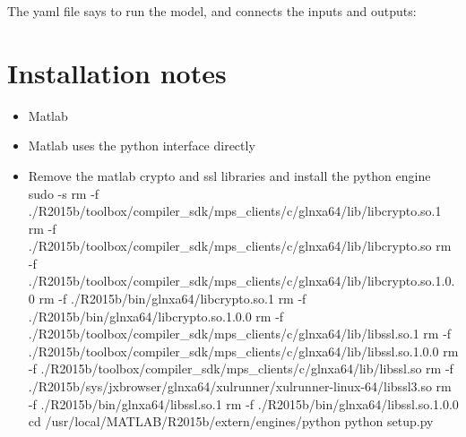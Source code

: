 \documentclass[letterpaper,10pt,english]{sphinxmanual}
\begin{document}
The yaml file says to run the model, and connects the inputs and
outputs:

\begin{sphinxVerbatim}[commandchars=\\\{\}]
   
   
   \PYG{p}{[}   \PYG{p}{]}

      
       
       
      
       

      
       
      
       
       
\end{sphinxVerbatim}


\section{Installation notes}
\label{\detokenize{includeme:installation-notes}}\begin{itemize}
\item {} 
Matlab

\item {} 
Matlab uses the python interface directly

\item {} 
Remove the matlab crypto and ssl libraries and install the python
engine sudo -s rm -f
./R2015b/toolbox/compiler\_sdk/mps\_clients/c/glnxa64/lib/libcrypto.so.1
rm -f
./R2015b/toolbox/compiler\_sdk/mps\_clients/c/glnxa64/lib/libcrypto.so
rm -f
./R2015b/toolbox/compiler\_sdk/mps\_clients/c/glnxa64/lib/libcrypto.so.1.0.0
rm -f ./R2015b/bin/glnxa64/libcrypto.so.1 rm -f
./R2015b/bin/glnxa64/libcrypto.so.1.0.0 rm -f
./R2015b/toolbox/compiler\_sdk/mps\_clients/c/glnxa64/lib/libssl.so.1
rm -f
./R2015b/toolbox/compiler\_sdk/mps\_clients/c/glnxa64/lib/libssl.so.1.0.0
rm -f
./R2015b/toolbox/compiler\_sdk/mps\_clients/c/glnxa64/lib/libssl.so
rm -f
./R2015b/sys/jxbrowser/glnxa64/xulrunner/xulrunner-linux-64/libssl3.so
rm -f ./R2015b/bin/glnxa64/libssl.so.1 rm -f
./R2015b/bin/glnxa64/libssl.so.1.0.0 cd
/usr/local/MATLAB/R2015b/extern/engines/python python setup.py

\end{itemize}
\end{document}
